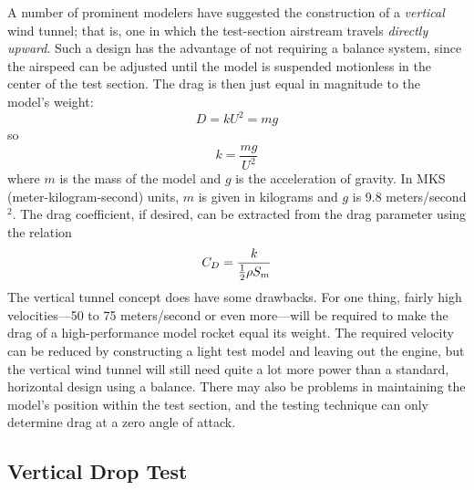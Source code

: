 A number of prominent modelers have suggested the construction of a
\emph{vertical} wind tunnel; that is, one in which the test-section airstream
travels \emph{directly upward}. Such a design has the advantage of not
requiring a balance system, since the airspeed can be adjusted until the model
is suspended motionless in the center of the test section. The drag is then
just equal in magnitude to the model's weight:
\begin{equation}\label{ch3:eq:219}
D = kU^{2} = mg
\end{equation}
so
\begin{equation}\label{ch3:eq:220}
k = \frac{mg}{U^{2}}
\end{equation}
where $m$ is the mass of the model and $g$ is the acceleration of gravity. In
MKS (meter-kilogram-second) units, $m$ is given in kilograms and $g$ is 9.8
meters/second$^{2}$. The drag coefficient, if desired, can be extracted from the
drag parameter using the relation
\begin{equation}\label{ch3:eq:221}
C_{D} = \frac{k}{\tfrac{1}{2}\rho S_m}
\end{equation}
The vertical tunnel concept does have some drawbacks. For one thing, fairly
high velocities---50 to 75 meters/second or even more---will be required to
make the drag of a high-performance model rocket equal its weight. The required
velocity can be reduced by constructing a light test model and leaving out the
engine, but the vertical wind tunnel will still need quite a lot more power
than a standard, horizontal design using a balance. There may also be problems
in maintaining the model's position within the test section, and the testing
technique can only determine drag at a zero angle of attack.

\subsection{Vertical Drop Test}\label{ch3:sec:8.3}


